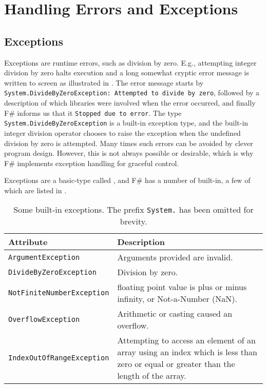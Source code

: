 \chapter{Handling Errors and Exceptions}
\label{chap:errors}

\section{Exceptions}
\label{sec:exceptions}
Exceptions are runtime errors, such as division by zero. E.g., attempting integer division by zero halts execution and a long somewhat cryptic error message is written to screen as illustrated in .
%
%
The error message starts by \lstinline[language=console]{System.DivideByZeroException: Attempted to divide by zero}, followed by a description of which libraries were involved when the error occurred, and finally F\# informs us that it \lstinline[language=console]{Stopped due to error}. The type \lstinline{System.DivideByZeroException} is a built-in exception type, and the built-in integer division operator chooses to raise the exception when the undefined division by zero is attempted. Many times such errors can be avoided by clever program design. However, this is not always possible or desirable, which is why F\# implements exception handling for graceful control.

Exceptions are a basic-type called , and F\# has a number of built-in, a few of which are listed in .
\begin{table}
  \centering
  \begin{tabularx}{\linewidth}{|l|X|}
    \hline
    \rowcolor{headerRowColor} Attribute & Description\\
    \hline
    \lstinline!ArgumentException! & Arguments provided are invalid.\\
    \hline
    \lstinline!DivideByZeroException! & Division by zero.\\
    \hline
    \lstinline!NotFiniteNumberException! & floating point value is plus or minus infinity, or Not-a-Number (NaN).\\
    \hline
    \lstinline!OverflowException! & Arithmetic or casting caused an overflow.\\
    \hline
    \lstinline!IndexOutOfRangeException! & Attempting to access an element of an array using an index which is less than zero or equal or greater than the length of the array.\\
    \hline
  \end{tabularx}
  \caption{Some built-in exceptions. The prefix \lstinline{System.} has been omitted for brevity.}
  \label{tab:exceptions}
\end{table}

